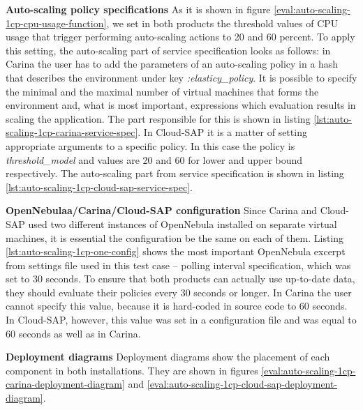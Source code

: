 \begin{asparaenum}
  \item[\textbf{Auto-scaling policy specifications}] As it is shown in figure \ref{eval:auto-scaling-1cp-cpu-usage-function}, we set in both products the threshold values of CPU usage that trigger performing auto-scaling actions to 20 and 60 percent. To apply this setting, the auto-scaling part of service specification looks as follows: in Carina the user has to add the parameters of an auto-scaling policy in a hash that describes the environment under key \emph{:elasticy\_policy}. It is possible to specify the minimal and the maximal number of virtual machines that forms the environment and, what is most important, expressions which evaluation results in scaling the application. The part responsible for this is shown in listing \ref{lst:auto-scaling-1cp-carina-service-spec}. In Cloud-SAP it is a matter of setting appropriate arguments to a specific policy. In this case the policy is \emph{threshold\_model} and values are 20 and 60 for lower and upper bound respectively. The auto-scaling part from service specification is shown in listing \ref{lst:auto-scaling-1cp-cloud-sap-service-spec}. 
  \item[\textbf{OpenNebulaa/Carina/Cloud-SAP configuration}] Since Carina and Cloud-SAP used two different instances of OpenNebula installed on separate virtual machines, it is essential the configuration be the same on each of them. Listing \ref{lst:auto-scaling-1cp-one-config} shows the most important OpenNebula excerpt from settings file used in this test case -- polling interval specification, which was set to 30 seconds. To ensure that both products can actually use up-to-date data, they should evaluate their policies every 30 seconds or longer. In Carina the user cannot specify this value, because it is hard-coded in source code to 60 seconds. In Cloud-SAP, however, this value was set in a configuration file and was equal to 60 seconds as well as in Carina. 
  \item[\textbf{Deployment diagrams}] Deployment diagrams show the placement of each component in both installations. They are shown in figures \ref{eval:auto-scaling-1cp-carina-deployment-diagram} and \ref{eval:auto-scaling-1cp-cloud-sap-deployment-diagram}.


\end{asparaenum}
